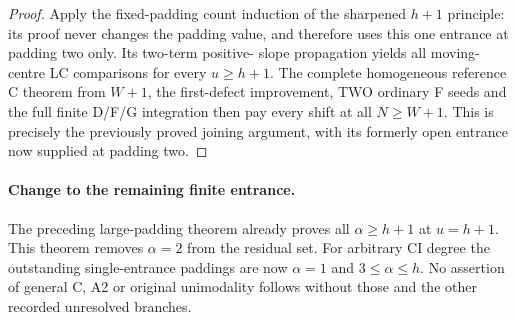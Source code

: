 \begin{proof}
Apply the fixed-padding count induction of the sharpened $h+1$
principle: its proof never changes the padding value, and therefore
uses this one entrance at padding two only. Its two-term positive-
slope propagation yields all moving-centre LC comparisons for
every $u\ge h+1$. The complete homogeneous reference C theorem
from $W+1$, the first-defect improvement, TWO ordinary F seeds
and the full finite D/F/G integration then pay every shift at all
$N\ge W+1$. This is precisely the previously proved joining
argument, with its formerly open entrance now supplied at padding two.
\end{proof}

\paragraph{Change to the remaining finite entrance.}
The preceding large-padding theorem already proves all
$\alpha\ge h+1$ at $u=h+1$. This theorem removes $\alpha=2$
from the residual set. For arbitrary CI degree the outstanding
single-entrance paddings are now $\alpha=1$ and $3\le\alpha\le h$.
No assertion of general C, A2 or original unimodality follows
without those and the other recorded unresolved branches.

